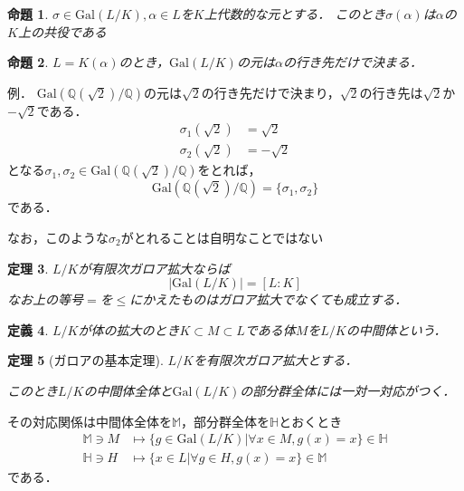 \documentclass[dvipdfmx,17pt]{beamer}
\theoremstyle{plain}
\newtheorem{thm}{定理}
\newtheorem{defi}[thm]{定義}
\newtheorem{prop}[thm]{命題}
\newcommand{\Q}{\mathbb{Q}}
\begin{document}
\begin{frame}
\begin{prop}
$\sigma \in \mathrm{Gal}(L/K), \alpha \in L$を$K$上代数的な元とする．
このとき$\sigma(\alpha)$は$\alpha$の$K$上の共役である
\end{prop}
\end{frame}

\begin{frame}
\begin{prop}
$L = K(\alpha)$のとき，$\mathrm{Gal}(L/K)$の元は$\alpha$の行き先だけで決まる．
\end{prop}
\end{frame}

\begin{frame}
例． $\mathrm{Gal}(\Q(\sqrt{2})/\Q)$の元は$\sqrt{2}$の行き先だけで決まり，$\sqrt{2}$の行き先は$\sqrt{2}$か$-\sqrt{2}$である．
\begin{align*}
\sigma_1(\sqrt{2}) &= \sqrt{2} \\
\sigma_2(\sqrt{2}) &= -\sqrt{2}
\end{align*}
となる$\sigma_1, \sigma_2 \in \mathrm{Gal}(\Q(\sqrt{2})/\Q)$をとれば，
\[ \mathrm{Gal}(\Q(\sqrt{2})/\Q) = \{\sigma_1, \sigma_2 \} \]
である．

{\tiny なお，このような$\sigma_2$がとれることは自明なことではない }
\end{frame}

\begin{frame}
\begin{thm}
$L/K$が有限次ガロア拡大ならば
\[ |\mathrm{Gal}(L/K)| = [L:K] \]
{\small なお上の等号$=$を$\le$にかえたものはガロア拡大でなくても成立する．}
\end{thm}
\end{frame}

\begin{frame}
\begin{defi}
$L/K$が体の拡大のとき$K \subset M \subset L$である体$M$を$L/K$の中間体という．
\end{defi}
\end{frame}

\begin{frame}
\begin{thm}[ガロアの基本定理]
$L/K$を有限次ガロア拡大とする．

このとき$L/K$の中間体全体と$\mathrm{Gal}(L/K)$の部分群全体には一対一対応がつく．
\end{thm}
\end{frame}

\begin{frame}
その対応関係は中間体全体を$\mathbb{M}$，部分群全体を$\mathbb{H}$とおくとき
{\footnotesize
\begin{align*}
\mathbb{M} \ni M &\mapsto \{g \in \mathrm{Gal}(L/K) | \forall x \in M, g(x) = x\} \in \mathbb{H} \\
\mathbb{H} \ni H &\mapsto \{x \in L | \forall g \in H, g(x) = x\} \in \mathbb{M}
\end{align*}}
である．
\end{frame}
\end{document}
